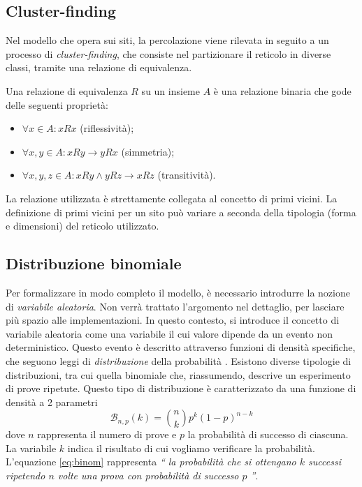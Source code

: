 \subsection*{Cluster-finding}
Nel modello che opera sui siti, la percolazione viene rilevata in seguito a un processo 
di \textit{cluster-finding}, che consiste nel partizionare il reticolo in diverse 
classi, tramite una relazione di equivalenza. 
\begin{definition}
Una relazione di equivalenza $R$ su un insieme $A$ è una relazione binaria 
che gode delle seguenti proprietà:
\begin{itemize}
    \item $\forall x \in A : xRx$ (riflessività);
    \item $\forall x,y \in A : xRy \rightarrow yRx$ (simmetria);
    \item $\forall x,y,z \in A: xRy \wedge yRz \rightarrow xRz$ (transitività).
\end{itemize}
\end{definition}
La relazione utilizzata è strettamente collegata al concetto di primi vicini.
La definizione di primi vicini per un sito può variare a seconda della tipologia
(forma e dimensioni) del reticolo utilizzato.

\subsection*{Distribuzione binomiale}
Per formalizzare in modo completo il modello, è necessario introdurre 
la nozione di \textit{variabile aleatoria}. Non verrà trattato l'argomento 
nel dettaglio, per lasciare più spazio alle implementazioni.
In questo contesto, si introduce il concetto di variabile aleatoria come 
una variabile il cui valore dipende da un evento non deterministico.
Questo evento è descritto attraverso funzioni di densità specifiche, che seguono 
leggi di \textit{distribuzione} della probabilità \cite{random}. Esistono diverse 
tipologie di distribuzioni, tra cui quella binomiale che, riassumendo, descrive 
un esperimento di prove ripetute.
Questo tipo di distribuzione è caratterizzato da una funzione di densità 
a 2 parametri
\begin{equation}
    \mathcal{B}_{n, p}(k) = \binom{n}{k} p^k (1-p)^{n-k}
\end{equation}
\label{eq:binom}
dove $n$ rappresenta il numero di prove e $p$ la probabilità di successo di ciascuna.
La variabile $k$ indica il risultato di cui vogliamo verificare la probabilità.
L'equazione \ref{eq:binom} rappresenta \textit{`` la probabilità che si ottengano $k$ successi
ripetendo $n$ volte una prova con probabilità di successo $p$ ''}.

